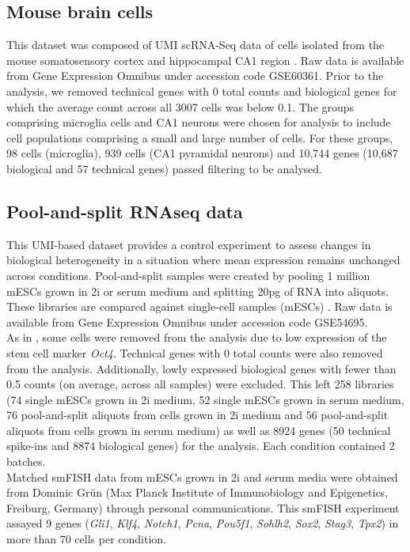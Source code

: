 \subsection{Mouse brain cells} \label{seq::data_micro}

This dataset was composed of UMI scRNA-Seq data of cells isolated from the mouse somatosensory cortex and hippocampal CA1 region \citep{Zeisel2015}. Raw data is available from Gene Expression Omnibus under accession code GSE60361. Prior to the analysis, we removed technical genes with 0 total counts and biological genes for which the average count across all 3007 cells was below 0.1. The groups comprising microglia cells and CA1 neurons were chosen for analysis to include cell populations comprising a small and large number of cells. For these groups, 98 cells (microglia), 939 cells (CA1 pyramidal neurons) and 10,744 genes (10,687 biological and 57 technical genes) passed filtering to be analysed.

\subsection{Pool-and-split RNAseq data} \label{seq::data_PaS}

This UMI-based dataset provides a control experiment to assess changes in biological heterogeneity in a situation where mean expression remains unchanged across conditions. Pool-and-split samples were created by pooling 1 million mESCs grown in 2i or serum medium and splitting 20pg of RNA into aliquots. These libraries are compared against single-cell samples (mESCs) \citep{Grun2014}. Raw data is available from Gene Expression Omnibus under accession code GSE54695. \\

As in \cite{Grun2014}, some cells were removed from the analysis due to low expression of the stem cell marker \textit{Oct4}. Technical genes with 0 total counts were also removed from the analysis. Additionally, lowly expressed biological genes with fewer than 0.5 counts (on average, across all samples) were excluded. This left 258 libraries (74 single mESCs grown in 2i medium, 52 single mESCs grown in serum medium, 76 pool-and-split aliquots from cells grown in 2i medium and 56 pool-and-split aliquots from cells grown in serum medium) as well as 8924 genes (50 technical spike-ins and 8874 biological genes) for the analysis. Each condition contained 2 batches.\\

Matched smFISH data from mESCs grown in 2i and serum media were obtained from Dominic Gr\"un (Max Planck Institute of Immunobiology and Epigenetics, Freiburg, Germany) through personal communications. This smFISH experiment assayed 9 genes (\textit{Gli1}, \textit{Klf4}, \textit{Notch1}, \textit{Pcna}, \textit{Pou5f1}, \textit{Sohlh2}, \textit{Sox2}, \textit{Stag3}, \textit{Tpx2}) in more than 70 cells per condition. %

